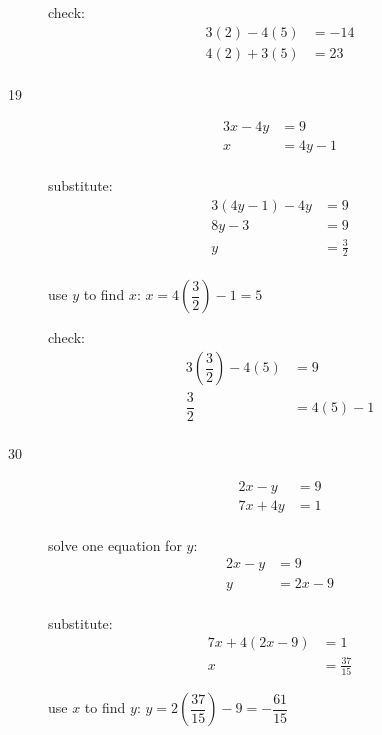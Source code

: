 \documentclass[fleqn,addpoints]{exam}
\begin{document}
\begin{description}
\vspace{0.2 cm}
\vspace{0.2 cm}

check:
\begin{align*}
  3(2)-4(5) &= -14 \\
  4(2)+3(5) &= 23 \\
\end{align*}

\item[19]
\begin{align*}
  3x-4y &= 9 \\
  x &= 4y-1 \\
\end{align*}

substitute:
\begin{align*}
  3(4y-1)-4y &= 9 \\
  8y-3 &= 9 \\
  y &= \frac{3}{2} \\
\end{align*}

use $y$ to find $x$: $x = 4\left( \dfrac{3}{2} \right) - 1 = 5$

\vspace{0.2 cm}
\vspace{0.2 cm}

check:
\begin{align*}
  3 \left( \dfrac{3}{2} \right)-4(5) &= 9 \\
  \dfrac{3}{2} &= 4(5)-1 \\
\end{align*}

\item[30]
\begin{align*}
  2x-y &= 9 \\
  7x+4y &= 1 \\
\end{align*}

solve one equation for $y$:
\begin{align*}
  2x-y &= 9 \\
  y &= 2x-9 \\
\end{align*}

substitute:
\begin{align*}
  7x+4(2x-9) &= 1 \\
  x &= \frac{37}{15}
\end{align*}

use $x$ to find $y$: $y = 2\left( \dfrac{37}{15} \right) - 9 = - \dfrac{61}{15}$


\end{description}
\end{document}
